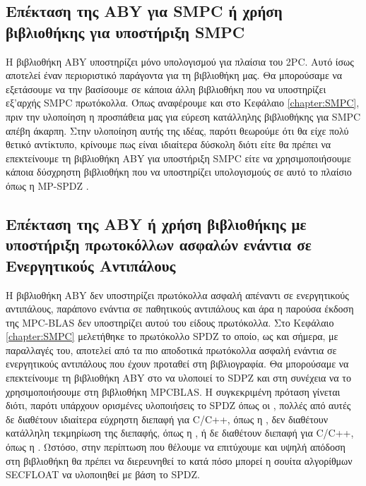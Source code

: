 \subsection{Επέκταση της ABY για SMPC ή χρήση βιβλιοθήκης για υποστήριξη SMPC}
Η βιβλιοθήκη ABY υποστηρίζει μόνο υπολογισμού για πλαίσια του 2PC. Αυτό ίσως αποτελεί έναν περιοριστικό παράγοντα για τη βιβλιοθήκη μας. Θα μπορούσαμε να εξετάσουμε να την βασίσουμε σε κάποια άλλη βιβλιοθήκη που να υποστηρίζει εξ'αρχής SMPC πρωτόκολλα. Όπως αναφέρουμε και στο Κεφάλαιο \ref{chapter:SMPC}, πριν την υλοποίηση η προσπάθεια μας για εύρεση κατάλληλης βιβλιοθήκης για SMPC απέβη άκαρπη. Στην υλοποίηση αυτής της ιδέας, παρότι θεωρούμε ότι θα είχε πολύ θετικό αντίκτυπο, κρίνουμε πως είναι ιδιαίτερα δύσκολη διότι είτε θα πρέπει να επεκτείνουμε τη βιβλιοθήκη ABY για υποστήριξη SMPC είτε να χρησιμοποιήσουμε κάποια δύσχρηστη βιβλιοθήκη που να υποστηρίζει υπολογισμούς σε αυτό το πλαίσιο όπως η MP-SPDZ \cite{mp-spdz}.

\subsection{Επέκταση της ABY ή χρήση βιβλιοθήκης με υποστήριξη πρωτοκόλλων ασφαλών ενάντια σε Ενεργητικούς Αντιπάλους}
Η βιβλιοθήκη ABY δεν υποστηρίζει πρωτόκολλα ασφαλή απέναντι σε ενεργητικούς αντιπάλους, παράπονο ενάντια σε παθητικούς αντιπάλους και άρα η παρούσα έκδοση της MPC-BLAS δεν υποστηρίζει αυτού του είδους πρωτόκολλα. Στο Κεφάλαιο \ref{chapter:SMPC} μελετήθηκε το πρωτόκολλο SPDZ το οποίο, ως και σήμερα, με παραλλαγές του, αποτελεί από τα πιο αποδοτικά πρωτόκολλα ασφαλή ενάντια σε ενεργητικούς αντιπάλους που έχουν προταθεί στη βιβλιογραφία. Θα μπορούσαμε να επεκτείνουμε τη βιβλιοθήκη ABY στο να υλοποιεί το SDPZ και στη συνέχεια να το χρησιμοποιήσουμε στη βιβλιοθήκη MPCBLAS. Η συγκεκριμένη πρόταση γίνεται διότι, παρότι υπάρχουν ορισμένες υλοποιήσεις το SPDZ όπως οι \cite{mp-spdz,aly2021scale,FRESCO}, πολλές από αυτές δε διαθέτουν ιδιαίτερα εύχρηστη διεπαφή για C/C++, όπως η \cite{aly2021scale}, δεν διαθέτουν κατάλληλη τεκμηρίωση της διεπαφής, όπως η \cite{mp-spdz}, ή δε διαθέτουν διεπαφή για C/C++, όπως η \cite{FRESCO}. Ωστόσο, στην περίπτωση που θέλουμε να επιτύχουμε και υψηλή απόδοση στη βιβλιοθήκη θα πρέπει να διερευνηθεί το κατά πόσο μπορεί η σουίτα αλγορίθμων SECFLOAT να υλοποιηθεί με βάση το SPDZ.